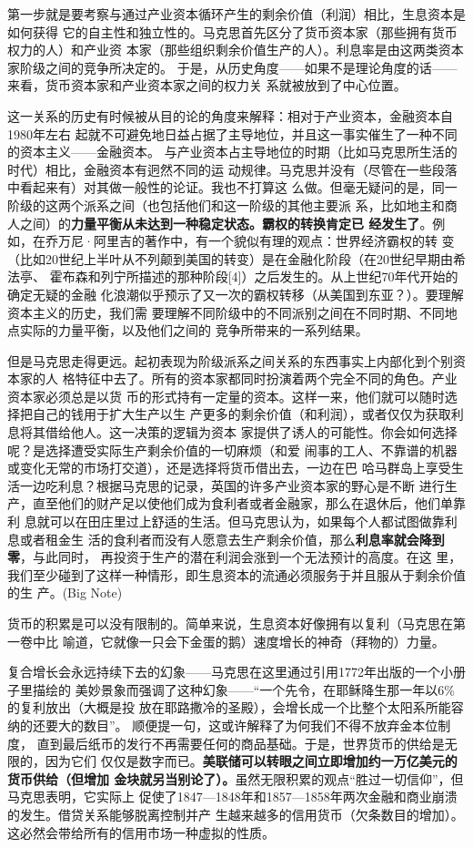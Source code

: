 第一步就是要考察与通过产业资本循环产生的剩余价值（利润）相比，生息资本是如何获得
它的自主性和独立性的。马克思首先区分了货币资本家（那些拥有货币权力的人）和产业资
本家（那些组织剩余价值生产的人）。利息率是由这两类资本家阶级之间的竞争所决定的。
于是，从历史角度——如果不是理论角度的话——来看，货币资本家和产业资本家之间的权力关
系就被放到了中心位置。

这一关系的历史有时候被从目的论的角度来解释：相对于产业资本，金融资本自1980年左右
起就不可避免地日益占据了主导地位，并且这一事实催生了一种不同的资本主义——金融资本。
与产业资本占主导地位的时期（比如马克思所生活的时代）相比，金融资本有迥然不同的运
动规律。马克思并没有（尽管在一些段落中看起来有）对其做一般性的论证。我也不打算这
么做。但毫无疑问的是，同一阶级的这两个派系之间（也包括他们和这一阶级的其他主要派
系，比如地主和商人之间）的\textbf{力量平衡从未达到一种稳定状态。霸权的转换肯定已
经发生了}。例如，在乔万尼·阿里吉的著作中，有一个貌似有理的观点：世界经济霸权的转
变（比如20世纪上半叶从不列颠到美国的转变）是在金融化阶段（在20世纪早期由希法亭、
霍布森和列宁所描述的那种阶段[4]）之后发生的。从上世纪70年代开始的确定无疑的金融
化浪潮似乎预示了又一次的霸权转移（从美国到东亚？）。要理解资本主义的历史，我们需
要理解不同阶级中的不同派别之间在不同时期、不同地点实际的力量平衡，以及他们之间的
竞争所带来的一系列结果。

但是马克思走得更远。起初表现为阶级派系之间关系的东西事实上内部化到个别资本家的人
格特征中去了。所有的资本家都同时扮演着两个完全不同的角色。产业资本家必须总是以货
币的形式持有一定量的资本。这样一来，他们就可以随时选择把自己的钱用于扩大生产以生
产更多的剩余价值（和利润），或者仅仅为获取利息将其借给他人。这一决策的逻辑为资本
家提供了诱人的可能性。你会如何选择呢？是选择遭受实际生产剩余价值的一切麻烦（和爱
闹事的工人、不靠谱的机器或变化无常的市场打交道），还是选择将货币借出去，一边在巴
哈马群岛上享受生活一边吃利息？根据马克思的记录，英国的许多产业资本家的野心是不断
进行生产，直至他们的财产足以使他们成为食利者或者金融家，那么在退休后，他们单靠利
息就可以在田庄里过上舒适的生活。但马克思认为，如果每个人都试图做靠利息或者租金生
活的食利者而没有人愿意去生产剩余价值，那么\textbf{利息率就会降到零}，与此同时，
再投资于生产的潜在利润会涨到一个无法预计的高度。在这
里，我们至少碰到了这样一种情形，即生息资本的流通必须服务于并且服从于剩余价值的生
产。(Big Note)

货币的积累是可以没有限制的。简单来说，生息资本好像拥有以复利（马克思在第一卷中比
喻道，它就像一只会下金蛋的鹅）速度增长的神奇（拜物的）力量。

复合增长会永远持续下去的幻象——马克思在这里通过引用1772年出版的一个小册子里描绘的
美妙景象而强调了这种幻象——“一个先令，在耶稣降生那一年以6\%的复利放出（大概是投
放在耶路撒冷的圣殿），会增长成一个比整个太阳系所能容纳的还要大的数目”。
 顺便提一句，这或许解释了为何我们不得不放弃金本位制度，
直到最后纸币的发行不再需要任何的商品基础。于是，世界货币的供给是无限的，因为它们
仅仅是数字而已。\textbf{美联储可以转眼之间立即增加约一万亿美元的货币供给（但增加
金块就另当别论了）。}虽然无限积累的观点“胜过一切信仰”，但马克思表明，它实际上
促使了1847—1848年和1857—1858年两次金融和商业崩溃的发生。借贷关系能够脱离控制并产
生越来越多的信用货币（欠条数目的增加）。这必然会带给所有的信用市场一种虚拟的性质。

